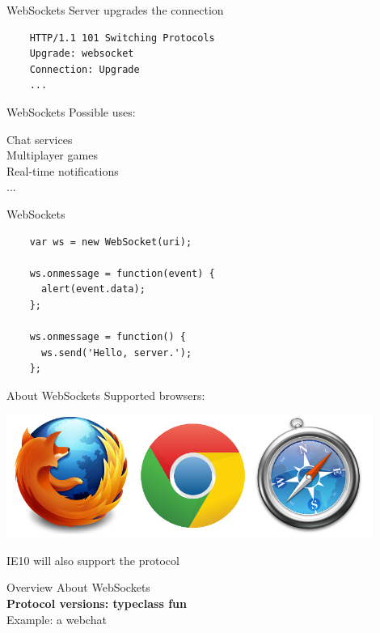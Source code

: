 \documentclass[20pt]{beamer}
\newcommand{\vspaced}{
    \vspace{5mm}
}
\begin{document}
\begin{frame}[fragile]{WebSockets}
    Server upgrades the connection
    \vspaced
    \begin{lstlisting}
    HTTP/1.1 101 Switching Protocols
    Upgrade: websocket
    Connection: Upgrade
    ...
    \end{lstlisting}
\end{frame}

\begin{frame}{WebSockets}
    Possible uses: \\
    \vspaced
    Chat services \\
    Multiplayer games \\
    Real-time notifications \\
    ...
\end{frame}

\begin{frame}[fragile]{WebSockets}
    \begin{lstlisting}
    var ws = new WebSocket(uri);

    ws.onmessage = function(event) {
      alert(event.data);
    };

    ws.onmessage = function() {
      ws.send('Hello, server.');
    };
    \end{lstlisting}
\end{frame}

\begin{frame}{About WebSockets}
    Supported browsers:
    \begin{center}
    \includegraphics[width=0.9\textwidth]{images/browsers.png}
    \end{center}
    IE10 will also support the protocol
\end{frame}


\begin{frame}{Overview}
    About WebSockets \\
    \textbf{Protocol versions: typeclass fun} \\
    Example: a webchat \\
\end{frame}
\end{document}
